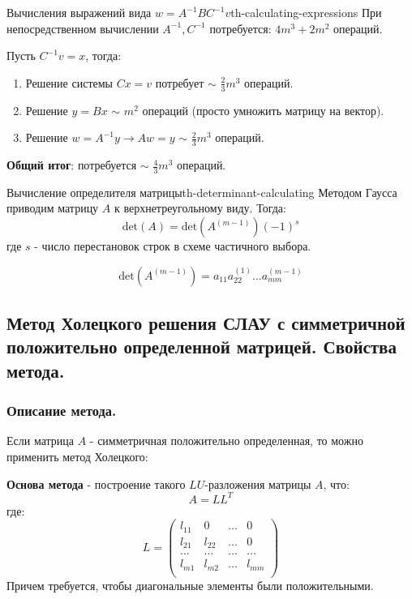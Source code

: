\documentclass[14pt]{extarticle}
\begin{document}
    \begin{theorem}{Вычисления выражений вида $w = A^{-1}BC^{-1}v$}{th-calculating-expressions}
        При непосредственном вычислении $A^{-1}, C^{-1}$ потребуется: $4m^{3} + 2m^{2}$ операций.

        \vspace{\baselineskip}

        Пусть $C^{-1}v = x$, тогда: 
        \begin{enumerate}
            \item Решение системы $Cx = v$ потребует $\sim$ $\frac{2}{3}m^{3}$ операций.
            \item Решение $y = Bx$ $\sim$ $m^{2}$ операций (просто умножить матрицу на вектор).
            \item Решение $w = A^{-1}y \rightarrow Aw = y$ $\sim$ $\frac{2}{3} m^{3}$ операций.
        \end{enumerate}
        \textbf{Общий итог}: потребуется $\sim$ $\frac{4}{3}m^{3}$ операций.
    \end{theorem}

    \begin{theorem}{Вычисление определителя матрицы}{th-determinant-calculating}
        Методом Гаусса приводим матрицу $A$ к верхнетреугольному виду. Тогда:
        $$\text{det}(A) = \text{det}(A^{(m - 1)})(-1)^s$$
        где $s$ - число перестановок строк в схеме частичного выбора.

        $$\text{det}(A^{(m-1)}) = a_{11}a_{22}^{(1)} \ldots a_{mm}^{(m - 1)}$$
    \end{theorem}

\clearpage
\subsection{Метод Холецкого решения СЛАУ с симметричной положительно определенной матрицей. Свойства метода.}

    \subsubsection{Описание метода.}

        Если матрица $A$ - симметричная положительно определенная, то можно применить метод Холецкого:

        \vspace{\baselineskip}

        \textbf{Основа метода} - построение такого $LU$-разложения матрицы $A$, что:
        $$A = LL^{T}$$
        где:
        $$
        L = \begin{pmatrix}
            l_{11} & 0 & \ldots & 0\\
            l_{21} & l_{22} & \ldots & 0\\
            \ldots & \ldots & \ldots & \ldots\\
            l_{m1} & l_{m2} & \ldots & l_{mm}\\
        \end{pmatrix}
        $$
        Причем требуется, чтобы диагональные элементы были положительными.
\end{document}
